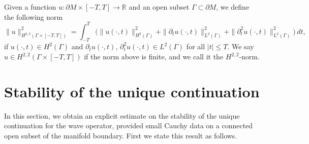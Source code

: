 \documentclass[11pt,letterpaper]{amsart}
\numberwithin{equation}{section}
\theoremstyle{definition}
\theoremstyle{plain}
\theoremstyle{definition}
\theoremstyle{plain}
\theoremstyle{definition}
\theoremstyle{plain}
\begin{document}
Given a function $u:\partial M\times [-T,T]\to \mathbb{R}$ and an open subset $\Gamma\subset \partial M$, we define the following norm
\begin{equation}\label{H21}
\|u\|_{H^{2,2}(\Gamma \times [-T,T])}^2=\int_{-T}^T \big(\|u(\cdot,t)\|_{H^2(\Gamma)}^2 +\|\partial_t u(\cdot,t)\|_{L^2(\Gamma)}^2+\|\partial_t^2 u(\cdot,t)\|_{L^2(\Gamma)}^2\big)\, dt,
\end{equation}
if $u(\cdot,t)\in H^2(\Gamma)$ and $\partial_t u(\cdot,t),\,\partial_t^2 u(\cdot,t) \in L^2(\Gamma)$ for all $|t|\leqslant T$. We say $u\in H^{2,2}(\Gamma\times[-T,T])$ if the norm above is finite, and we call it the $H^{2,2}$-norm.

\section{Stability of the unique continuation}\label{section-uc}

In this section, we obtain an explicit estimate on the stability of the unique continuation for the wave operator, provided small Cauchy data on a connected open subset of the manifold boundary.  First we state this result as follows.
\end{document}
